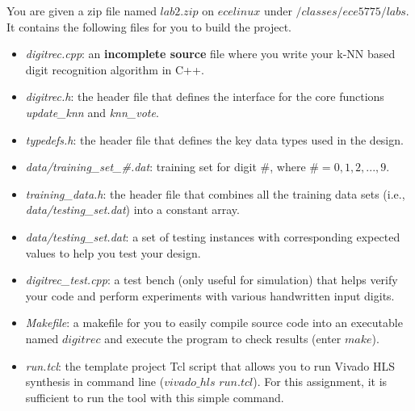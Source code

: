 \documentclass[paper=letter, fontsize=10pt]{scrartcl} %
\numberwithin{equation}{section} %
\numberwithin{figure}{section} %
\numberwithin{table}{section} %
\begin{document}

You are given a zip file named 
$lab2.zip$ on $ecelinux$ under $/classes/ece5775/labs$. It contains the following files for you to build the project. 

\begin{itemize}

\item \textit{digitrec.cpp}: an \textbf{incomplete source} file where you write your k-NN based digit recognition algorithm in C++.
\item \textit{digitrec.h}: the header file that defines the interface for the core functions \textit{update\_knn} and \textit{knn\_vote}.
\item \textit{typedefs.h}: the header file that defines the key data types used in the design.
\item \textit{data/training\_set\_\#.dat}: training set for digit $\#$, where $\#=0,1,2,...,9$.
\item \textit{training\_data.h}: the header file that combines all the training data sets (i.e., \textit{data/testing\_set.dat}) into a constant array. 
\item \textit{data/testing\_set.dat}: a set of testing instances with corresponding expected values to help you test your design.
\item \textit{digitrec\_test.cpp}: a test bench (only useful for simulation) that helps verify your code and perform experiments with various handwritten input digits.
\item \textit{Makefile}: a makefile for you to easily compile source code into an executable named $digitrec$ and execute the program to check results (enter $make$).
\item \textit{run.tcl}: the template project Tcl script that allows you to run Vivado HLS synthesis in command line ($vivado\_hls$ $run.tcl$). For this assignment, it is sufficient to run the tool with this simple command. 
\end{itemize}
\end{document}
